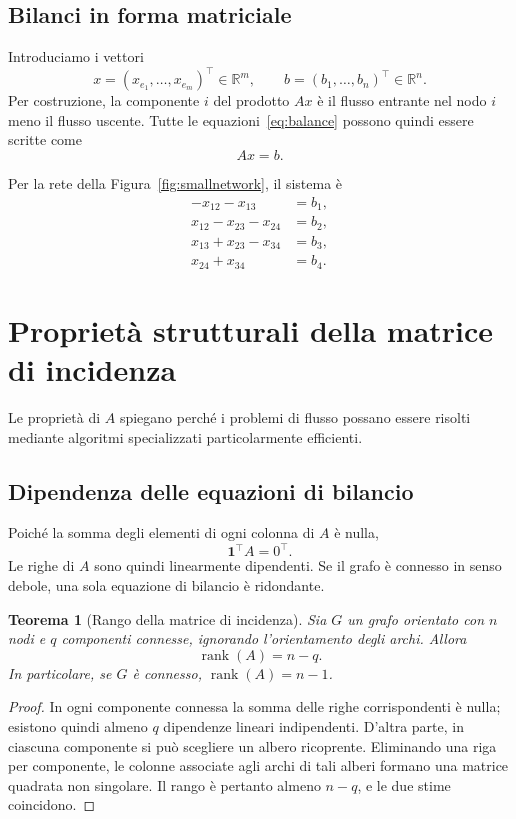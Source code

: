 \documentclass[11pt,a4paper]{article}
\newtheorem{theorem}[definition]{Teorema}
\newcommand{\R}{\mathbb{R}}
\begin{document}
\subsection{Bilanci in forma matriciale}

Introduciamo i vettori
\[
  x=(x_{e_1},\ldots,x_{e_m})^\top\in\R^m,
  \qquad
  b=(b_1,\ldots,b_n)^\top\in\R^n.
\]
Per costruzione, la componente $i$ del prodotto $Ax$ è il flusso entrante nel nodo $i$ meno il flusso uscente. Tutte le equazioni~\eqref{eq:balance} possono quindi essere scritte come
\begin{equation}\label{eq:Ax=b}
  \boxed{Ax=b.}
\end{equation}

Per la rete della Figura~\ref{fig:smallnetwork}, il sistema è
\begin{align*}
-x_{12}-x_{13} &= b_1,\\
x_{12}-x_{23}-x_{24} &= b_2,\\
x_{13}+x_{23}-x_{34} &= b_3,\\
x_{24}+x_{34} &= b_4.
\end{align*}

\section{Proprietà strutturali della matrice di incidenza}

Le proprietà di $A$ spiegano perché i problemi di flusso possano essere risolti mediante algoritmi specializzati particolarmente efficienti.

\subsection{Dipendenza delle equazioni di bilancio}

Poiché la somma degli elementi di ogni colonna di $A$ è nulla,
\[
  \boldsymbol{1}^\top A=0^\top.
\]
Le righe di $A$ sono quindi linearmente dipendenti. Se il grafo è connesso in senso debole, una sola equazione di bilancio è ridondante.

\begin{theorem}[Rango della matrice di incidenza]
Sia $G$ un grafo orientato con $n$ nodi e $q$ componenti connesse, ignorando l'orientamento degli archi. Allora
\[
  \operatorname{rank}(A)=n-q.
\]
In particolare, se $G$ è connesso, $\operatorname{rank}(A)=n-1$.
\end{theorem}

\begin{proof}
In ogni componente connessa la somma delle righe corrispondenti è nulla; esistono quindi almeno $q$ dipendenze lineari indipendenti. D'altra parte, in ciascuna componente si può scegliere un albero ricoprente. Eliminando una riga per componente, le colonne associate agli archi di tali alberi formano una matrice quadrata non singolare. Il rango è pertanto almeno $n-q$, e le due stime coincidono.
\end{proof}
\end{document}
